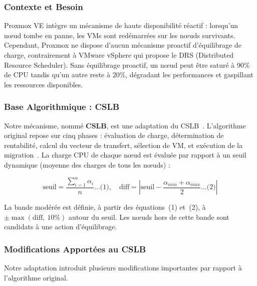 \subsubsection{Contexte et Besoin}

\par Proxmox VE intègre un mécanisme de haute disponibilité réactif : lorsqu'un nœud tombe en panne, les VMs sont redémarrées sur les nœuds survivants. Cependant, Proxmox ne dispose d'aucun mécanisme proactif d'équilibrage de charge, contrairement à VMware vSphere qui propose le DRS (Distributed Resource Scheduler). Sans équilibrage proactif, un nœud peut être saturé à 90\% de CPU tandis qu'un autre reste à 20\%, dégradant les performances et gaspillant les ressources disponibles.\\

\subsubsection{Base Algorithmique : CSLB}

\par Notre mécanisme, nommé \textbf{CSLB}, est une adaptation du CSLB~\cite{ref38}. L'algorithme original repose sur cinq phases : évaluation de charge, détermination de rentabilité, calcul du vecteur de transfert, sélection de VM, et exécution de la migration~\cite{ref17}. La charge CPU de chaque nœud est évaluée par rapport à un seuil dynamique (moyenne des charges de tous les nœuds) :

\[
\text{seuil} = \frac{\sum_{i=1}^{n} \alpha_i}{n}\text{...(1)}, \quad \text{diff} = \left|\text{seuil} - \frac{\alpha_{min} + \alpha_{max}}{2} \text{...(2)}\right|
\]

\par La bande modérée est définie, à partir des équations~(1) et~(2), à $\pm\max(\text{diff},\ 10\%)$ autour du seuil. Les nœuds hors de cette bande sont candidats à une action d'équilibrage.\\


\subsubsection{Modifications Apportées au CSLB}

\par Notre adaptation introduit plusieurs modifications importantes par rapport à l'algorithme original.\\

